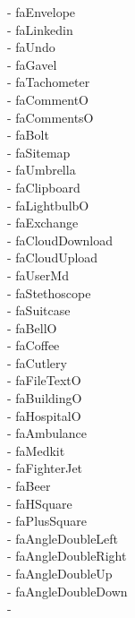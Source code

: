 \documentclass[%
               doublesided,
               paper=a4,
               fontsize=10pt
              ]{my-resume}
\begin{document}
- faEnvelope\\ \faLinkedin - faLinkedin\\ \faUndo - faUndo\\ \faGavel - faGavel\\ \faTachometer - faTachometer\\ \faCommentO - faCommentO\\ \faCommentsO - faCommentsO\\ \faBolt - faBolt\\ \faSitemap - faSitemap\\ \faUmbrella - faUmbrella\\ \faClipboard - faClipboard\\ \faLightbulbO - faLightbulbO\\ \faExchange - faExchange\\ \faCloudDownload - faCloudDownload\\ \faCloudUpload - faCloudUpload\\ \faUserMd - faUserMd\\ \faStethoscope - faStethoscope\\ \faSuitcase - faSuitcase\\ \faBellO - faBellO\\ \faCoffee - faCoffee\\ \faCutlery - faCutlery\\ \faFileTextO - faFileTextO\\ \faBuildingO - faBuildingO\\ \faHospitalO - faHospitalO\\ \faAmbulance - faAmbulance\\ \faMedkit - faMedkit\\ \faFighterJet - faFighterJet\\ \faBeer - faBeer\\ \faHSquare - faHSquare\\ \faPlusSquare - faPlusSquare\\ \faAngleDoubleLeft - faAngleDoubleLeft\\ \faAngleDoubleRight - faAngleDoubleRight\\ \faAngleDoubleUp - faAngleDoubleUp\\ \faAngleDoubleDown - faAngleDoubleDown\\ \faAngleLeft - 
\end{document}
